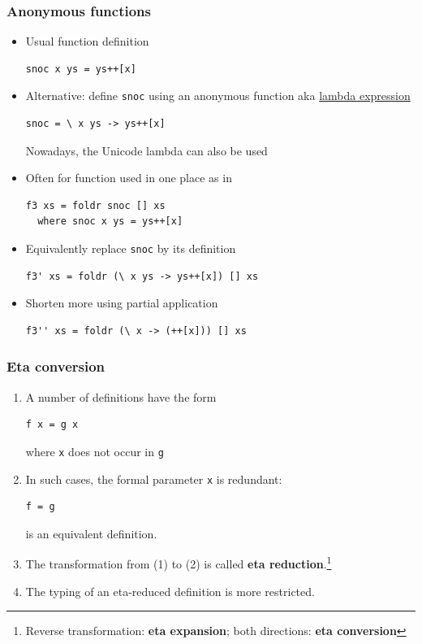 \documentclass{beamer}
\begin{document}
\begin{frame}[fragile]
  \frametitle{Anonymous functions}
  \begin{itemize}
  \item<+-> Usual function definition
\begin{verbatim}
snoc x ys = ys++[x]
\end{verbatim}
  \item<+->
  Alternative: define \texttt{snoc} using an anonymous function aka
  \href{https://en.wikipedia.org/wiki/Anonymous_function}{lambda
    expression} 
\begin{verbatim}
snoc = \ x ys -> ys++[x]
\end{verbatim}
  Nowadays, the Unicode lambda can also be used
\item<+->
  Often for function used in one place as in
\begin{verbatim}
f3 xs = foldr snoc [] xs
  where snoc x ys = ys++[x]
\end{verbatim}
\item<+-> Equivalently replace \texttt{snoc} by its definition
\begin{verbatim}
f3' xs = foldr (\ x ys -> ys++[x]) [] xs
\end{verbatim}
\item<+-> Shorten more using partial application
\begin{verbatim}
f3'' xs = foldr (\ x -> (++[x])) [] xs
\end{verbatim}
\end{itemize}
\end{frame}
\begin{frame}[fragile]
  \frametitle{Eta conversion}
  \begin{enumerate}
  \item A number of definitions have the form
\begin{verbatim}
f x = g x
\end{verbatim}
    where \texttt{x} does not occur in \texttt{g}
  \item 
    In such cases, the formal parameter \texttt{x} is redundant:
\begin{verbatim}
f = g
\end{verbatim}
    is an equivalent definition.
  \item The transformation from (1) to (2) is called \textbf{eta reduction}.\footnote{Reverse transformation: \textbf{eta expansion}; both directions: \textbf{eta conversion}}
  \item The typing of an eta-reduced definition is more restricted.
\end{enumerate}
\end{frame}
\end{document}
